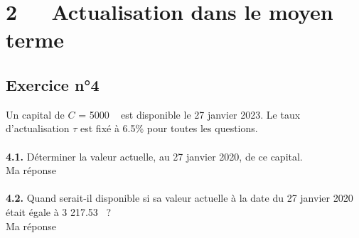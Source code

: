 \documentclass{article}
\begin{document}
\section{2   Actualisation dans le moyen terme}
\subsection{Exercice n°4}
\textcolor{exogris}{
Un capital de $C$ = 5000 \texteuro  est disponible le 27 janvier 2023. Le taux d’actualisation $\tau$ est fixé à 6.5\% pour toutes les questions.
}
\\\\ \textcolor{exogris}{\textbf{4.1.}
Déterminer la valeur actuelle, au 27 janvier 2020, de ce capital.
}
\\%
Ma réponse
\\%
\\%
\textcolor{exogris}{\textbf{4.2.}
Quand serait-il disponible si sa valeur actuelle à la date du 27 janvier 2020 était égale à 3 217.53 \texteuro ?
}
\\%
Ma réponse


\end{document}
